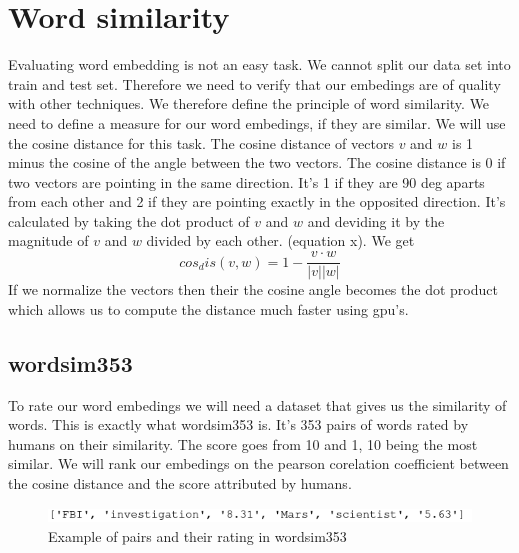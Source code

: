 \section{Word similarity}
Evaluating word embedding is not an easy task. We cannot split our data set into train and test set. Therefore we need to verify that our embedings are of quality with other techniques. We therefore define the principle of word similarity. We need to define a measure for our word embedings, if they are similar. We will use the cosine distance for this task. The cosine distance of vectors $v$ and $w$ is 1 minus the cosine of the angle between the two vectors. The cosine distance is 0 if two vectors are pointing in the same direction. It's 1 if they are 90 deg aparts from each other and 2 if they are pointing exactly in the opposited direction. It's calculated by taking the dot product of $v$ and $w$ and deviding it by the magnitude of $v$ and $w$ divided by each other. (equation x). We get
\begin{equation}
cos_dis(v,w) =1 - \frac{v \cdot w}{|v| |w|} 
\end{equation}
If we normalize the vectors then their the cosine angle becomes the dot product which allows us to compute the distance much faster using gpu's. 
\subsection{wordsim353}
To rate our word embedings we will need a dataset that gives us the similarity of words. This is exactly what wordsim353 is. It's 353 pairs of words rated by humans on their similarity. The score goes from 10 and 1, 10 being the most similar. We will rank our embedings on the pearson corelation coefficient between the cosine distance and the score attributed by humans. 
\begin{figure}[ht]
    \centering
			\includegraphics[scale=0.7]{images/wordsim353_example} 
    \caption{Example of pairs and their rating in wordsim353}
    \label{fig:efficient}
\end{figure}

